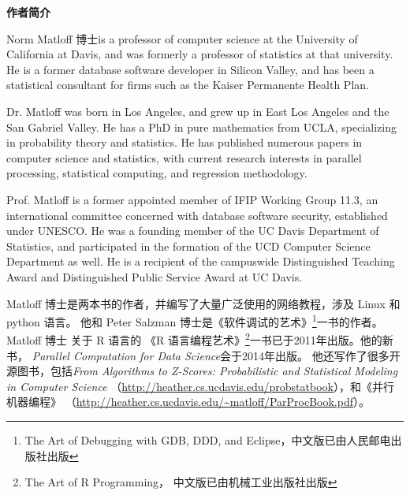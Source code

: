 \begin{center}
{\bf 作者简介}
\end{center}

Norm Matloff 博士is a professor of computer science at the University of
California at Davis, and was formerly a professor of statistics at that
university. He is a former database software developer in Silicon
Valley, and has been a statistical consultant for firms such as the
Kaiser Permanente Health Plan.

Dr. Matloff was born in Los Angeles, and grew up in East Los Angeles and
the San Gabriel Valley. He has a PhD in pure mathematics from UCLA,
specializing in probability theory and statistics.  He has published
numerous papers in computer science and statistics, with current
research interests in parallel processing, statistical computing,
and regression methodology.

Prof. Matloff is a former appointed member of IFIP Working Group 11.3,
an international committee concerned with database software security,
established under UNESCO.  He was a founding member of the UC Davis
Department of Statistics, and participated in the formation of the UCD
Computer Science Department as well.  He is a recipient of the
campuswide Distinguished Teaching Award and Distinguished Public Service
Award at UC Davis.

Matloff 博士是两本书的作者，并编写了大量广泛使用的网络教程，涉及 Linux 和 python 语言。
他和 Peter Salzman 博士是《软件调试的艺术》\footnote{The Art of Debugging with GDB, DDD, and
Eclipse，中文版已由人民邮电出版社出版}一书的作者。Matloff 博士
关于 R 语言的 《R 语言编程艺术》\footnote{The Art of R Programming，
中文版已由机械工业出版社出版}一书已于2011年出版。他的新书， {\it Parallel
Computation for Data Science}会于2014年出版。
他还写作了很多开源图书，包括{\it From Algorithms
to Z-Scores: Probabilistic and Statistical Modeling in Computer Science}
（\url{http://heather.cs.ucdavis.edu/probstatbook}），和《并行机器编程》
（\url{http://heather.cs.ucdavis.edu/~matloff/ParProcBook.pdf}）。
